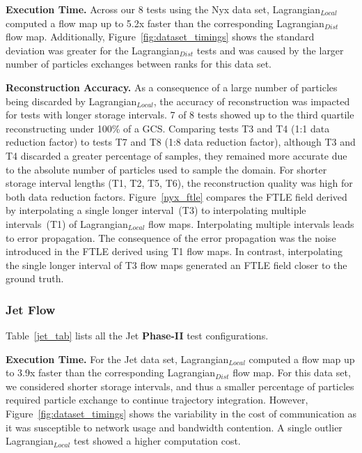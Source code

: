 \textbf{Execution Time.} Across our 8 tests using the Nyx data set, Lagrangian$_{Local}$ computed a flow map up to 5.2x faster than the corresponding Lagrangian$_{Dist}$ flow map.
%
Additionally, Figure~\ref{fig:dataset_timings} shows the standard deviation was greater for the Lagrangian$_{Dist}$ tests and was caused by the larger number of particles exchanges between ranks for this data set.
%

%


\textbf{Reconstruction Accuracy.} As a consequence of a large number of particles being discarded by Lagrangian$_{Local}$, the accuracy of reconstruction was impacted for tests with longer storage intervals.
%
7 of 8 tests showed up to the third quartile reconstructing under 100\% of a GCS. 
%
Comparing tests T3 and T4 (1:1 data reduction factor) to tests T7 and T8 (1:8 data reduction factor), although T3 and T4 discarded a greater percentage of samples, they remained more accurate due to the absolute number of particles used to sample the domain.
%
For shorter storage interval lengths (T1, T2, T5, T6), the reconstruction quality was high for both data reduction factors.
%
{Figure~\ref{nyx_ftle} compares the FTLE field derived by interpolating a single longer interval~(T3) to interpolating multiple intervals~(T1) of Lagrangian$_{Local}$ flow maps.
%
Interpolating multiple intervals leads to error propagation.
%
The consequence of the error propagation was the noise introduced in the FTLE derived using T1 flow maps.
%
In contrast, interpolating the single longer interval of T3 flow maps generated an FTLE field closer to the ground truth.
%
}
%



\vspace{-2mm}
\subsubsection{Jet Flow}
\label{sec:jet}
Table~\ref{jet_tab} lists all the Jet \textbf{Phase-II} test configurations.
%


\textbf{Execution Time.} For the Jet data set, Lagrangian$_{Local}$ computed a flow map up to 3.9x faster than the corresponding Lagrangian$_{Dist}$ flow map.
%
For this data set, we considered shorter storage intervals, and thus a smaller percentage of particles required particle exchange to continue trajectory integration.
%
However, Figure~\ref{fig:dataset_timings} shows the variability in the cost of communication as it was susceptible to network usage and bandwidth contention.
%
A single outlier Lagrangian$_{Local}$ test showed a higher computation cost. 

